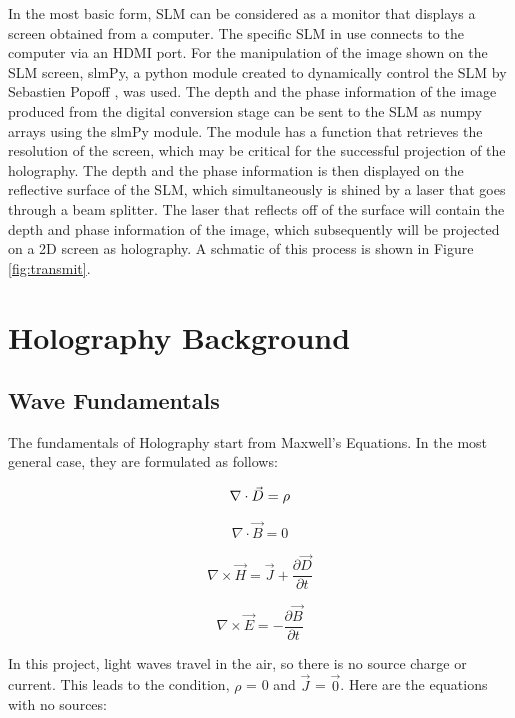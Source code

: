 \documentclass[12pt]{article}
\begin{document}
In the most basic form, SLM can be considered as a monitor that displays a screen obtained from a computer. The specific SLM in use connects to the computer via an HDMI port. For the manipulation of the image shown on the SLM screen, slmPy, a python module created to dynamically control the SLM by Sebastien Popoff \cite{slmPy}, was used. The depth and the phase information of the image produced from the digital conversion stage can be sent to the SLM as numpy arrays using the slmPy module. The module has a function that retrieves the resolution of the screen, which may be critical for the successful projection of the holography. The depth and the phase information is then displayed on the reflective surface of the SLM, which simultaneously is shined by a laser that goes through a beam splitter. The laser that reflects off of the surface will contain the depth and phase information of the image, which subsequently will be projected on a 2D screen as holography. A schmatic of this process is shown in Figure \ref{fig:transmit}.


\section{Holography Background}

\subsection{Wave Fundamentals}

The fundamentals of Holography start from Maxwell's Equations. In the most general case, they are formulated as follows:

\begin{equation}
	\nabla \cdot \vec{D} = \rho\\
\end{equation}

\begin{equation}
	\nabla \cdot \vec{B} = 0
\end{equation}

\begin{equation}
	\nabla \times \vec{H} = \vec{J} + \frac{\partial \vec{D}}{\partial t}
\end{equation}

\begin{equation}
	\nabla \times \vec{E} = -\frac{\partial \vec{B}}{\partial t}
\end{equation}

In this project, light waves travel in the air, so there is no source charge or current. This leads to the condition, \(\rho\) = 0 and \(\vec{J}\) = \(\vec{0}\). Here are the equations with no sources:
\end{document}

